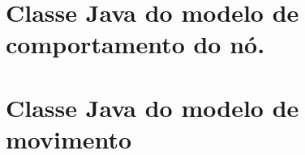 \documentclass{uflamon-22}          %
\begin{document}
\newpage 

\section{Classe Java do modelo de comportamento do nó.}
\label{app:comportamentoNo}


\newpage 

\section{Classe Java do modelo de movimento}
\label{app:movimento}


\end{document}
